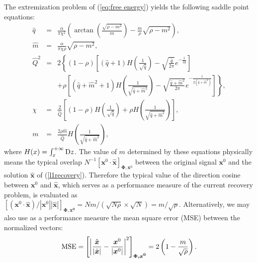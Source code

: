 \documentclass[12pt]{iopart}
\newcommand{\vm}[1]{\boldsymbol{#1}}
\begin{document}
The extremization problem of (\ref{eq:free energy}) yields the following saddle point equations: 
\begin{eqnarray}
\hat{q}&=&\frac{\alpha}{\pi \chi^2} \left(\arctan \left(\frac{\sqrt{\rho-m^2}}{m}\right) -\frac{m}{\rho}\sqrt{\rho-m^2}\right), \\
\hat{m}&=&\frac{\alpha}{\pi\chi\rho}\sqrt{\rho-m^2}, \\
\hat{Q}^{2}&=&2\left\{ \left(1-\rho\right)\left[\left(\hat{q}+1\right)H\left(\frac{1}{\sqrt{\hat{q}}}\right)
          -\sqrt{\frac{\hat{q}}{2\pi}}e^{-\frac{1}{2\hat{q}}} \right] \right . \nonumber\\
          &&\left . +\rho\left[\left(\hat{q}+\hat{m}^2+1\right)H\left(\frac{1}{\sqrt{\hat{q}+\hat{m}^2}}\right)
          -\sqrt{\frac{\hat{q}+\hat{m}^2}{2\pi}}e^{-\frac{1}{2\left(\hat{q}+\hat{m}^2\right)}}\right]\right\}, \\
\chi&=&\frac{2}{\hat{Q}}\left[\left(1-\rho\right)
H\left(\frac{1}{\sqrt{\hat{q}}}\right)+\rho H\left(\frac{1}{\sqrt{\hat{q}+\hat{m}^2}}\right)\right], \\
m&=&\frac{2\rho\hat{m}}{\hat{Q}}H\left(\frac{1}{\sqrt{\hat{q}+\hat{m}^2}}\right), 
\label{results}
\end{eqnarray}
where $H(x)=\int_x^{+\infty} {\rm D}z$. The value of $m$ determined by these equations physically means the typical overlap $N^{-1} \left [\vm{x}^0 \cdot \hat{\vm{x}} \right]_{\vm{\Phi}, \vm{x}^0} $ between the original signal $\vm{x}^0$ and the solution $\hat{\vm{x}}$ of (\ref{l1recovery}). Therefore the typical value of the direction cosine between $\vm{x}^0$ and $\hat{\vm{x}}$, which serves as a performance measure of the current recovery problem, is evaluated as $\left [(\vm{x}^0 \cdot \hat{\vm{x}})/|\vm{x}^0| |\hat{\vm{x}}| \right]_{\vm{\Phi,\vm{x}^0}} =N m /(\sqrt{N \rho} \times \sqrt{N})=m/\sqrt{\rho}$. Alternatively, we may also use as a performance measure the mean square error (MSE) between the normalized vectors:
\begin{eqnarray}
{\rm MSE}=\left [ \left |\frac{\hat{\vm{x}}}{|\hat{\vm{x}}|}-\frac{\vm{x}^0}{|\vm{x}^0|} \right |^2 \right ]_{\vm{\Phi,\vm{x}^0}}
=2\left (1-\frac{m}{\sqrt{\rho}} \right ).
\label{MSE}
\end{eqnarray}
 
\end{document}
